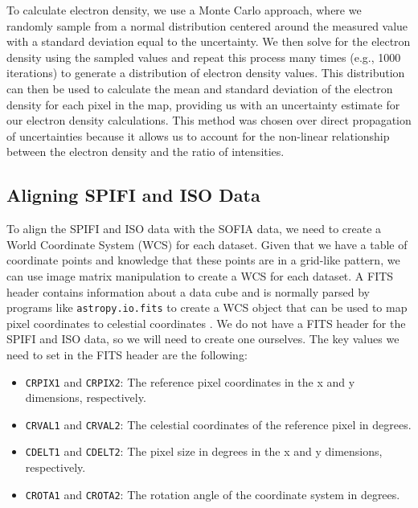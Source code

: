 To calculate electron density, we use a Monte Carlo approach, where we randomly sample from a normal distribution centered around the measured value with a standard deviation equal to the uncertainty.
We then solve for the electron density using the sampled values and repeat this process many times (e.g., 1000 iterations) to generate a distribution of electron density values.
This distribution can then be used to calculate the mean and standard deviation of the electron density for each pixel in the map, providing us with an uncertainty estimate for our electron density calculations.
This method was chosen over direct propagation of uncertainties because it allows us to account for the non-linear relationship between the electron density and the ratio of intensities.

\subsection{Aligning SPIFI and ISO Data}
\label{carina/sec:fits_fit}
To align the SPIFI and ISO data with the SOFIA data, we need to create a World Coordinate System (WCS) for each dataset.
Given that we have a table of coordinate points and knowledge that these points are in a grid-like pattern, we can use image matrix manipulation to create a WCS for each dataset.
A FITS header contains information about a data cube and is normally parsed by programs like \texttt{astropy.io.fits} to create a WCS object that can be used to map pixel coordinates to celestial coordinates \parencite{wells1979fits}.
We do not have a FITS header for the SPIFI and ISO data, so we will need to create one ourselves.
The key values we need to set in the FITS header are the following:
\begin{itemize}
    \item \texttt{CRPIX1} and \texttt{CRPIX2}: The reference pixel coordinates in the x and y dimensions, respectively.
    \item \texttt{CRVAL1} and \texttt{CRVAL2}: The celestial coordinates of the reference pixel in degrees.
    \item \texttt{CDELT1} and \texttt{CDELT2}: The pixel size in degrees in the x and y dimensions, respectively.
    \item \texttt{CROTA1} and \texttt{CROTA2}: The rotation angle of the coordinate system in degrees.
\end{itemize}

